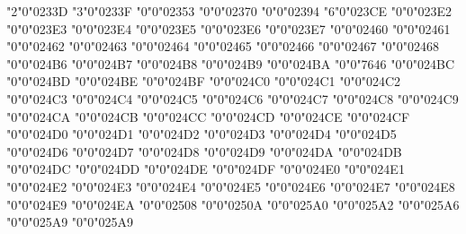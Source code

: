 \mchardef\obar"2"0"0233D
\mchardef\APLnotslash"3"0"0233F
\mchardef\APLboxupcaret"0"0"02353
\mchardef\APLboxquestion"0"0"02370
\mchardef\hexagon"0"0"02394
\def\hlineextender{\delim"0"0"023AF }
\def\sumtop{\delim"0"0"023B2 }
\def\sumbottom{\delim"0"0"023B3 }
\def\overbracket{\maccent"7"0"023B4 }
\def\underbracket{\maccent"7"0"023B5 }
\mchardef\varcarriagereturn"6"0"023CE
\mchardef\trapezium"0"0"023E2
\mchardef\benzenr"0"0"023E3
\mchardef\strns"0"0"023E4
\mchardef\fltns"0"0"023E5
\mchardef\accurrent"0"0"023E6
\mchardef\elinters"0"0"023E7
\mchardef\circledone"0"0"02460
\mchardef\circledtwo"0"0"02461
\mchardef\circledthree"0"0"02462
\mchardef\circledfour"0"0"02463
\mchardef\circledfive"0"0"02464
\mchardef\circledsix"0"0"02465
\mchardef\circledseven"0"0"02466
\mchardef\circledeight"0"0"02467
\mchardef\circlednine"0"0"02468
\mchardef\circledA"0"0"024B6
\mchardef\circledB"0"0"024B7
\mchardef\circledC"0"0"024B8
\mchardef\circledD"0"0"024B9
\mchardef\circledE"0"0"024BA
\mchardef\circledF"0"0"7646
\mchardef\circledG"0"0"024BC
\mchardef\circledH"0"0"024BD
\mchardef\circledI"0"0"024BE
\mchardef\circledJ"0"0"024BF
\mchardef\circledK"0"0"024C0
\mchardef\circledL"0"0"024C1
\mchardef\circledM"0"0"024C2
\mchardef\circledN"0"0"024C3
\mchardef\circledO"0"0"024C4
\mchardef\circledP"0"0"024C5
\mchardef\circledQ"0"0"024C6
\mchardef\circledR"0"0"024C7
\mchardef\circledS"0"0"024C8
\let\circS\circledS
\mchardef\circledT"0"0"024C9
\mchardef\circledU"0"0"024CA
\mchardef\circledV"0"0"024CB
\mchardef\circledW"0"0"024CC
\mchardef\circledX"0"0"024CD
\mchardef\circledY"0"0"024CE
\mchardef\circledZ"0"0"024CF
\mchardef\circleda"0"0"024D0
\mchardef\circledb"0"0"024D1
\mchardef\circledc"0"0"024D2
\mchardef\circledd"0"0"024D3
\mchardef\circlede"0"0"024D4
\mchardef\circledf"0"0"024D5
\mchardef\circledg"0"0"024D6
\mchardef\circledh"0"0"024D7
\mchardef\circledi"0"0"024D8
\mchardef\circledj"0"0"024D9
\mchardef\circledk"0"0"024DA
\mchardef\circledl"0"0"024DB
\mchardef\circledm"0"0"024DC
\mchardef\circledn"0"0"024DD
\mchardef\circledo"0"0"024DE
\mchardef\circledp"0"0"024DF
\mchardef\circledq"0"0"024E0
\mchardef\circledr"0"0"024E1
\mchardef\circleds"0"0"024E2
\mchardef\circledt"0"0"024E3
\mchardef\circledu"0"0"024E4
\mchardef\circledv"0"0"024E5
\mchardef\circledw"0"0"024E6
\mchardef\circledx"0"0"024E7
\mchardef\circledy"0"0"024E8
\mchardef\circledz"0"0"024E9
\mchardef\circledzero"0"0"024EA
\mchardef\bdquadhdash"0"0"02508
\mchardef\bdquadvdash"0"0"0250A
\mchardef\mdlgblksquare"0"0"025A0
\mchardef\squoval"0"0"025A2
\mchardef\squarehvfill"0"0"025A6
\mchardef\squarecrossfill"0"0"025A9
\mchardef\squaregrayfill"0"0"025A9
